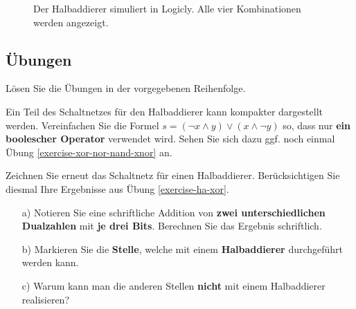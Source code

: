 \begin{figure}[H]
\begin{minipage}{0.45\textwidth}
\end{minipage}
\caption{Der Halbaddierer simuliert in Logicly. Alle vier Kombinationen werden angezeigt.}
\end{figure}

\newpage

\subsection{Übungen}

Lösen Sie die Übungen in der vorgegebenen Reihenfolge.

\begin{exercise}
\label{exercise-ha-xor}
Ein Teil des Schaltnetzes für den Halbaddierer kann kompakter dargestellt werden. Vereinfachen Sie die Formel $s = (\neg x \wedge y) \vee (x \wedge \neg y)$ so, dass nur \textbf{ein boolescher Operator} verwendet wird. Sehen Sie sich dazu ggf. noch einmal Übung \ref{exercise-xor-nor-nand-xnor} an.
\fillwithgrid{0.5in}
\end{exercise}

\begin{exercise}
Zeichnen Sie erneut das Schaltnetz für einen Halbaddierer. Berücksichtigen Sie diesmal Ihre Ergebnisse aus Übung \ref{exercise-ha-xor}.
\fillwithgrid{2in}
\end{exercise}

\begin{exercise}
\begin{enumerate}
\item[a)] Notieren Sie eine schriftliche Addition von \textbf{zwei unterschiedlichen Dualzahlen} mit \textbf{je drei Bits}. Berechnen Sie das Ergebnis schriftlich.
\fillwithgrid{1in}
\item[b)] Markieren Sie die \textbf{Stelle}, welche mit einem \textbf{Halbaddierer} durchgeführt werden kann.
\item[c)] Warum kann man die anderen Stellen \textbf{nicht} mit einem Halbaddierer realisieren?
\end{enumerate}
\end{exercise}
